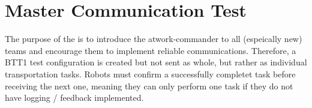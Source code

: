 
\newpage
\section{Master Communication Test}

The purpose of the  is to introduce the atwork-commander to all (espeically new) teams and encourage them to implement reliable communications.
Therefore, a BTT1 test configuration is created but not sent as whole, but rather as individual transportation tasks.
Robots must confirm a successfully completet task before receiving the next one, meaning they can only perform one task if they do not have logging / feedback implemented.
